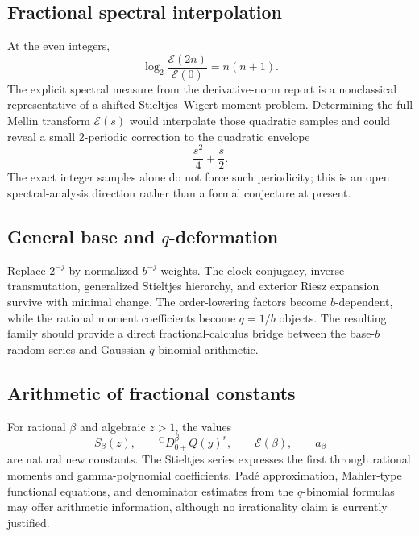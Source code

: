 \documentclass[11pt,oneside]{article}
\numberwithin{equation}{section}
\theoremstyle{plain}
\theoremstyle{definition}
\theoremstyle{remark}
\newcommand{\Ccap}{\mathrm C}
\begin{document}
\subsection{Fractional spectral interpolation}

At the even integers,
\begin{equation}
 \log_2\frac{\mathcal E(2n)}{\mathcal E(0)}=n(n+1).
 \label{eq:E-quadratic-samples}
\end{equation}
The explicit spectral measure from the derivative-norm report is a
nonclassical representative of a shifted Stieltjes--Wigert moment problem.
Determining the full Mellin transform $\mathcal E(s)$ would interpolate those
quadratic samples and could reveal a small $2$-periodic correction to the
quadratic envelope
\begin{equation}
 \frac{s^2}{4}+\frac{s}{2}.
 \label{eq:E-quadratic-envelope}
\end{equation}
The exact integer samples alone do not force such periodicity; this is an
open spectral-analysis direction rather than a formal conjecture at present.

\subsection{General base and \texorpdfstring{$q$}{q}-deformation}

Replace $2^{-j}$ by normalized $b^{-j}$ weights.  The clock conjugacy,
inverse transmutation, generalized Stieltjes hierarchy, and exterior Riesz
expansion survive with minimal change.  The order-lowering factors become
$b$-dependent, while the rational moment coefficients become $q=1/b$
objects.  The resulting family should provide a direct fractional-calculus
bridge between the base-$b$ random series and Gaussian $q$-binomial
arithmetic.

\subsection{Arithmetic of fractional constants}

For rational $\beta$ and algebraic $z>1$, the values
\begin{equation}
 S_\beta(z),
 \qquad
 {}^{\Ccap}D_{0+}^\beta Q(y)^r,
 \qquad
 \mathcal E(\beta),
 \qquad
 a_\beta
 \label{eq:fractional-constants}
\end{equation}
are natural new constants.  The Stieltjes series expresses the first through
rational moments and gamma-polynomial coefficients.  Pad\'e approximation,
Mahler-type functional equations, and denominator estimates from the
$q$-binomial formulas may offer arithmetic information, although no
irrationality claim is currently justified.
\end{document}
